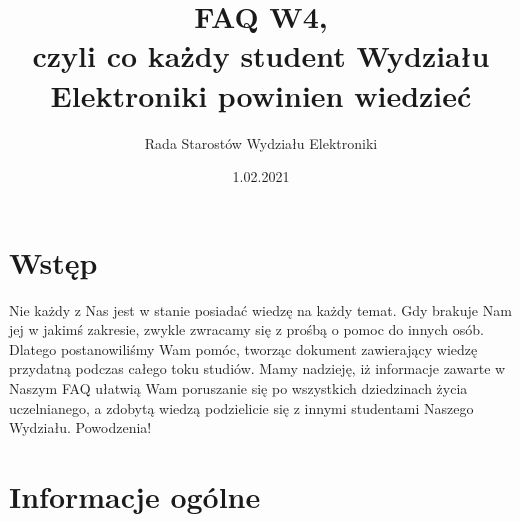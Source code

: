 \documentclass[11pt]{article}
\title{\textcolor{BrickRed}{\Huge FAQ W4,\\czyli co każdy student Wydziału Elektroniki powinien wiedzieć}\\}
\author{Rada Starostów Wydziału Elektroniki}
\date{1.02.2021}
\begin{document}
\maketitle

\vspace{0.5cm}

\begin{center}
\end{center}
\newpage

\tableofcontents

\newpage

\section{Wstęp} 
\indent \hspace{0.5cm} Nie każdy z Nas jest w stanie posiadać wiedzę na każdy temat. Gdy brakuje Nam jej w jakimś zakresie, zwykle zwracamy się z prośbą o pomoc do innych osób. Dlatego postanowiliśmy Wam pomóc, tworząc dokument zawierający wiedzę przydatną podczas całego toku studiów. Mamy nadzieję, iż informacje zawarte w Naszym FAQ ułatwią Wam poruszanie się \linebreak po wszystkich dziedzinach życia uczelnianego, a zdobytą wiedzą podzielicie się z innymi studentami Naszego Wydziału. Powodzenia! \\

\newpage
\section{Informacje ogólne}
\end{document}
